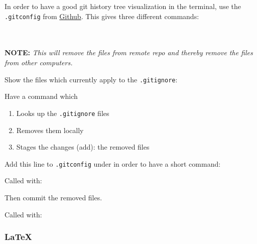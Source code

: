 

In order to have a good git history tree visualization in the terminal, use the \texttt{.gitconfig} from \href{https://github.com/robinhellmers/computer_setup/blob/master/git_setup/gitconfig}{Github}. This gives three different commands:\\
\\
\\


\textbf{NOTE:} \textit{This will remove the files from remote repo and thereby remove the files from other computers.}

Show the files which currently apply to the \texttt{.gitignore}:


Have a command which 
\begin{enumerate}
    \item Looks up the \texttt{.gitignore} files
    \item Removes them locally
    \item Stages the changes (add): the removed files
\end{enumerate}

Add this line to \texttt{.gitconfig} under \code{[alias]} in order to have a short command:


Called with:


Then commit the removed files.\\




Called with:



\subsubsection{LaTeX}

